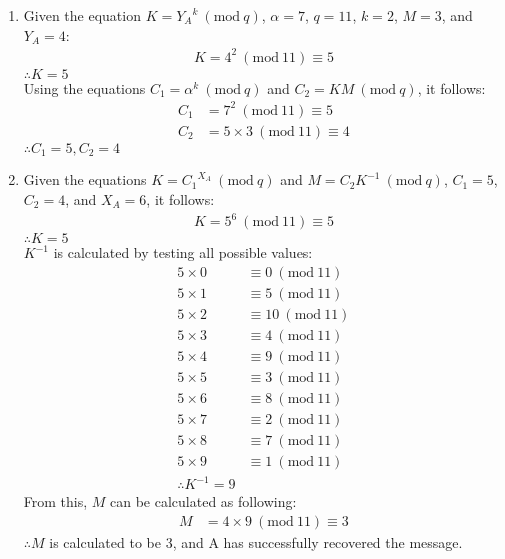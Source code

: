 \documentclass{article}
\newcommand{\Mod}[1]{\ (\mathrm{mod}\ #1)}
\begin{document}
\begin{enumerate}
\begin{enumerate}
        \item Given the equation $K = {Y_A}^k \Mod{q}$, $\alpha = 7$, $q = 11$, $k = 2$, $M = 3$, and $Y_A = 4$:
        \begin{align*}
            K = 4^2 \Mod{11} \equiv 5
        \end{align*}
        $\therefore K = 5$\\
        Using the equations $C_1 = \alpha^k \Mod{q}$ and $C_2 = KM \Mod{q}$, it follows:
        \begin{align*}
            C_1 &= 7^2 \Mod{11} \equiv 5 \\
            C_2 &= 5\times3 \Mod{11} \equiv 4
        \end{align*}
        $\therefore C_1 = 5, C_2 = 4$

        \item Given the equations $K = {C_1}^{X_A} \Mod{q}$ and $M = C_2K^{-1} \Mod{q}$, $C_1 = 5$, $C_2 = 4$, and $X_A = 6$, it follows:
        \begin{align*}
            K = 5^6 \Mod{11} \equiv 5
        \end{align*}
        $\therefore K = 5$ \\
        $K^{-1}$ is calculated by testing all possible values:
        \begin{align*}
            5 \times 0 &\equiv 0 \Mod{11} \\
            5 \times 1 &\equiv 5 \Mod{11} \\ 
            5 \times 2 &\equiv 10 \Mod{11} \\
            5 \times 3 &\equiv 4 \Mod{11} \\
            5 \times 4 &\equiv 9 \Mod{11} \\
            5 \times 5 &\equiv 3 \Mod{11} \\
            5 \times 6 &\equiv 8 \Mod{11} \\
            5 \times 7 &\equiv 2 \Mod{11} \\
            5 \times 8 &\equiv 7 \Mod{11} \\
            5 \times 9 &\equiv 1 \Mod{11} \\
            \therefore K^{-1} = 9
        \end{align*}
        From this, $M$ can be calculated as following:
        \begin{align*}
            M &= 4 \times 9 \Mod{11} \equiv 3
        \end{align*}
        $\therefore M$ is calculated to be 3, and A has successfully recovered the message.
    \end{enumerate}


\end{enumerate}
\end{document}
